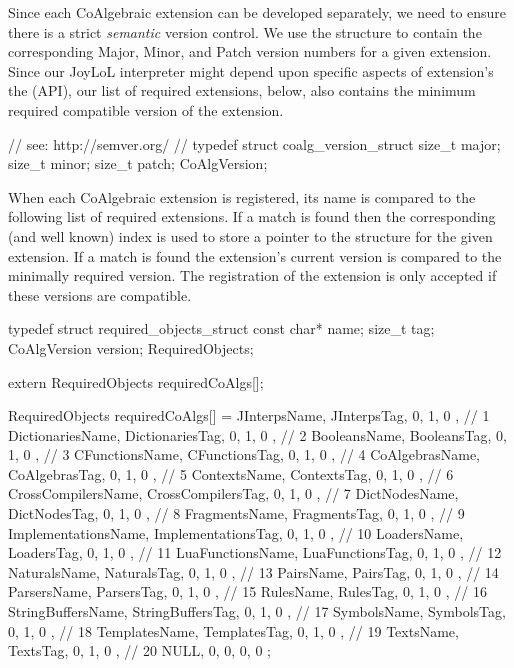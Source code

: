 Since each CoAlgebraic extension can be developed separately, we need to 
ensure there is a strict \emph{semantic} version control. We use the 
 structure to contain the corresponding Major, Minor, 
and Patch version numbers for a given extension. Since our JoyLoL 
interpreter might depend upon specific aspects of extension's the 
 (API), our list of required 
extensions, below, also contains the minimum required compatible version 
of the extension. 

\startCHeader
// see: http://semver.org/
//
typedef struct coalg_version_struct {
  size_t major;
  size_t minor;
  size_t patch;
} CoAlgVersion;
\stopCHeader

When each CoAlgebraic extension is registered, its name is compared to the 
following list of required extensions. If a match is found then the 
corresponding (and well known) index is used to store a pointer to the 
 structure for the given extension. If a match is found 
the extension's current version is compared to the minimally required 
version. The registration of the extension is only accepted if these 
versions are compatible. 

\startCHeader
typedef struct required_objects_struct {
  const char*  name;
  size_t       tag;
  CoAlgVersion version;
} RequiredObjects;

extern RequiredObjects requiredCoAlgs[];
\stopCHeader
{}

\startCCode
RequiredObjects requiredCoAlgs[] = {
  { JInterpsName,        JInterpsTag,        {0, 1, 0 }}, //  1
  { DictionariesName,    DictionariesTag,    {0, 1, 0 }}, //  2
  { BooleansName,        BooleansTag,        {0, 1, 0 }}, //  3
  { CFunctionsName,      CFunctionsTag,      {0, 1, 0 }}, //  4
  { CoAlgebrasName,      CoAlgebrasTag,      {0, 1, 0 }}, //  5
  { ContextsName,        ContextsTag,        {0, 1, 0 }}, //  6
  { CrossCompilersName,  CrossCompilersTag,  {0, 1, 0 }}, //  7
  { DictNodesName,       DictNodesTag,       {0, 1, 0 }}, //  8
  { FragmentsName,       FragmentsTag,       {0, 1, 0 }}, //  9
  { ImplementationsName, ImplementationsTag, {0, 1, 0 }}, // 10
  { LoadersName,         LoadersTag,         {0, 1, 0 }}, // 11
  { LuaFunctionsName,    LuaFunctionsTag,    {0, 1, 0 }}, // 12
  { NaturalsName,        NaturalsTag,        {0, 1, 0 }}, // 13
  { PairsName,           PairsTag,           {0, 1, 0 }}, // 14
  { ParsersName,         ParsersTag,         {0, 1, 0 }}, // 15
  { RulesName,           RulesTag,           {0, 1, 0 }}, // 16
  { StringBuffersName,   StringBuffersTag,   {0, 1, 0 }}, // 17
  { SymbolsName,         SymbolsTag,         {0, 1, 0 }}, // 18
  { TemplatesName,       TemplatesTag,       {0, 1, 0 }}, // 19
  { TextsName,           TextsTag,           {0, 1, 0 }}, // 20
  { NULL,                0,                  {0, 0, 0 }}
};
\stopCCode

